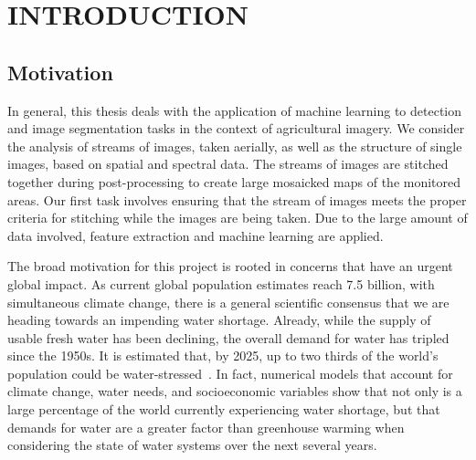 

\pagestyle{plain} %
\setcounter{page}{1}


\chapter{\uppercase {Introduction}}

\section{Motivation}

In general, this thesis deals with the application of machine learning to detection and image segmentation tasks in the context of agricultural imagery.
We consider the analysis of streams of images, taken aerially, as well as the structure of single images, based on spatial and spectral data.
The streams of images are stitched together during post-processing to create large mosaicked maps of the monitored areas.
Our first task involves ensuring that the stream of images meets the proper criteria for stitching while the images are being taken.
Due to the large amount of data involved, feature extraction and machine learning are applied.

The broad motivation for this project is rooted in concerns that have an urgent global impact.
As current global population estimates reach 7.5 billion, with simultaneous climate change, there is a general scientific consensus that we are heading towards an impending water shortage.
Already, while the supply of usable fresh water has been declining, the overall demand for water has tripled since the 1950s.
It is estimated that, by 2025, up to two thirds of the world's population could be water-stressed~\cite{waterresources}.
In fact, numerical models that account for climate change, water needs, and socioeconomic variables show that not only is a large percentage of the world currently experiencing water shortage, but that demands for water are a greater factor than greenhouse warming when considering the state of water systems over the next several years.

